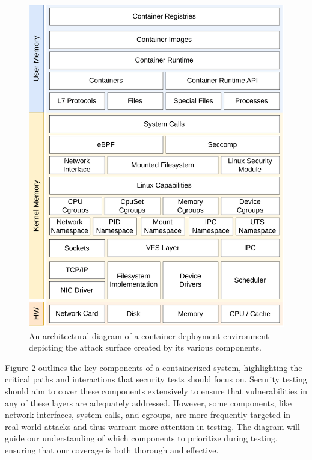 \begin{figure}
  \label{fig:architecture}
  \includegraphics[width=1\linewidth]{figs/exploit-coverage.pdf}
  \caption{An architectural diagram of a container deployment environment depicting the attack surface created by its various components.}
\end{figure}

Figure 2 outlines the key components of a containerized system, highlighting the critical paths and interactions that security tests should focus on. Security testing should aim to cover these components extensively to ensure that vulnerabilities in any of these layers are adequately addressed. However, some components, like network interfaces, system calls, and cgroups, are more frequently targeted in real-world attacks and thus warrant more attention in testing. The diagram will guide our understanding of which components to prioritize during testing, ensuring that our coverage is both thorough and effective.
